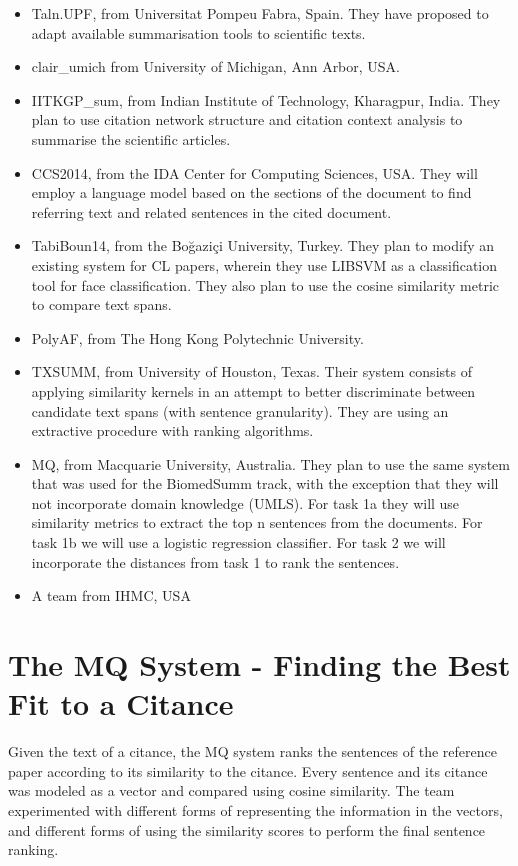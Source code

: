 \documentclass[11pt]{article}
\begin{document}
\begin{itemize}
\item{Taln.UPF, from Universitat Pompeu Fabra, Spain. They have proposed to adapt available summarisation tools to scientific texts.}
\item{clair\_umich from University of Michigan, Ann Arbor, USA.}
\item{IITKGP\_sum, from Indian Institute of Technology, Kharagpur, India. They plan to use citation network structure and citation context analysis to summarise the scientific articles.}
\item{CCS2014, from the IDA Center for Computing Sciences, USA. They will employ a language model based on the sections of the document to find referring text and related sentences in the cited document.}
\item{TabiBoun14, from the Boğaziçi University, Turkey. They plan to modify an existing system for CL papers, wherein they use LIBSVM as a classification tool for face classification. They also plan to use the cosine similarity metric to compare text spans.}
\item{PolyAF, from The Hong Kong Polytechnic University.}
\item{TXSUMM, from University of Houston, Texas. Their system consists of applying similarity kernels in an attempt to better discriminate between candidate text spans (with sentence granularity). They are using an extractive procedure with ranking algorithms.}
\item{MQ, from Macquarie University, Australia. They plan to use the same system that was used for the BiomedSumm track, with the exception that they will not incorporate domain knowledge (UMLS). For task 1a they will use similarity metrics to extract the top n sentences from the documents. For task 1b we will use a logistic regression classifier. For task 2 we will incorporate the distances from task 1 to rank the sentences.}
\item{A team from IHMC, USA}

\end{itemize}

\section{The MQ System - Finding the Best Fit to a Citance}

Given the text of a citance, the MQ system ranks the sentences of the reference paper according to its similarity to the citance. Every sentence and its citance was modeled as a vector and compared using cosine similarity. The team experimented with different forms of representing the information in the vectors, and different forms of using the similarity scores to perform the final sentence ranking.
\end{document}
